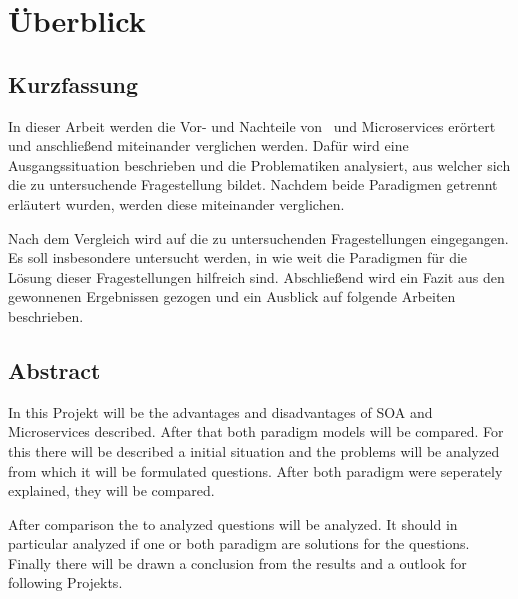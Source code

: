\chapter*{Überblick}
\section*{Kurzfassung}
In dieser Arbeit werden die Vor- und Nachteile von \SOA\ und Microservices erörtert und anschließend miteinander verglichen werden. Dafür wird eine Ausgangssituation beschrieben und die Problematiken analysiert, aus welcher sich die zu untersuchende Fragestellung bildet. Nachdem beide Paradigmen getrennt erläutert wurden, werden diese miteinander verglichen.

Nach dem Vergleich wird auf die  zu untersuchenden Fragestellungen eingegangen. Es soll insbesondere untersucht werden, in wie weit die Paradigmen für die Lösung dieser Fragestellungen hilfreich sind. Abschließend wird ein Fazit aus den gewonnenen Ergebnissen gezogen und ein Ausblick auf folgende Arbeiten beschrieben.

\section*{Abstract}
In this Projekt will be the advantages and disadvantages of SOA and Microservices described. After that both paradigm models will be compared. For this there will be described a initial situation and the problems will be analyzed from which it will be formulated questions. After both paradigm were seperately explained, they will be compared.

After comparison the to analyzed questions will be analyzed. It should in particular analyzed if one or both paradigm are solutions for the questions. Finally there will be drawn a conclusion from the results and a outlook for following Projekts.